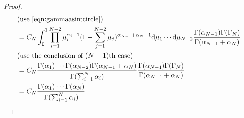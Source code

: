 \begin{proof}
\begin{equation}
\begin{split}
&(\text{use \eqref{eqn:gammaasintcircle}})\\
&=C_{N}\int_{0}^{1}\prod_{i=1}^{N-2}\mu_{i}^{\alpha_{i}-1}(1-\sum_{j=1}^{N-2}\mu_{j})^{\alpha_{N-1}+\alpha_{N}-1}\text{d}\mu_{1}\cdots\text{d}\mu_{N-2}\frac{\Gamma(\alpha_{N-1})\Gamma(\Gamma_{N})}{\Gamma(\alpha_{N-1}+\alpha_{N})}\\
&(\text{use the conclusion of }(N-1)\text{th case})\\
&=C_{N}\frac{\Gamma(\alpha_1)\cdots\Gamma(\alpha_{N-2})\Gamma(\alpha_{N-1}+\alpha_{N})}{\Gamma(\sum_{i=1}^{N}\alpha_{i})}\frac{\Gamma(\alpha_{N-1})\Gamma(\Gamma_{N})}{\Gamma(\alpha_{N-1}+\alpha_{N})}\\
&=C_{N}\frac{\Gamma(\alpha_1)\cdots\Gamma(\alpha_{N})}{\Gamma(\sum_{i=1}^{N}\alpha_{i})}
\end{split}
\end{equation}
\end{proof}

